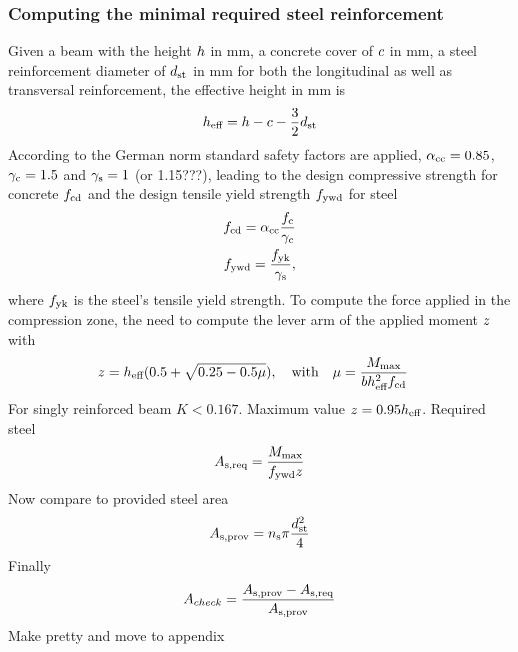\subsubsection{Computing the minimal required steel reinforcement}
Given a beam with the height $h$ in mm, a concrete cover of $c$ in mm, a steel reinforcement diameter of $d_{\text{st}}$ in mm for both the longitudinal as well as transversal reinforcement, the effective height in mm is
\begin{align}
	h_{\text{eff}} = h - c - \frac{3}{2} d_{\text{st}}
\end{align}
According to the German norm standard safety factors are applied, $\alpha_{\text{cc}} = 0.85$, $\gamma_{\text{c}} = 1.5$ and $\gamma_{\text{s}} = 1$ (or 1.15???), leading to the design compressive strength for concrete $f_{\text{cd}}$ and  the design tensile yield strength $f_{\text{ywd}}$ for steel
\begin{align}
	f_{\text{cd}} = \alpha_{\text{cc}} \frac{f_{\text{c}} }{\gamma_{\text{c}}}\\
	f_{\text{ywd}} = \frac{f_{\text{yk}}}{\gamma_{\text{s}}},
\end{align}
where $f_{\text{yk}}$ is the steel's tensile yield strength.
To compute the force applied in the compression zone, the need to compute the lever arm of the applied moment $z$ with 
\begin{align}
	z &= h_{\text{eff}}(0.5+\sqrt{0.25-0.5 \mu}),\quad \text{with}\quad
	\mu = \frac{M_{\text{max}} }{b h_{\text{eff}}^2 f_{\text{cd}}}
\end{align}
For singly reinforced beam $K < 0.167$.
Maximum value $z = 0.95h_{\text{eff}}$.
Required steel
\begin{align}
	A_{\text{s,req}} = \frac{M_{\text{max}}}{f_{\text{ywd}} z}
\end{align}
Now compare to provided steel area
\begin{align}
	A_{\text{s,prov}} = n_{\text{s}} \pi \frac{d_{\text{st}}^2}{4} 
\end{align}
Finally 
\begin{align}
	A_{check} = \frac{A_{\text{s,prov}} - A_{\text{s,req}}}{A_{\text{s,prov}}}
\end{align}
Make pretty and move to appendix
